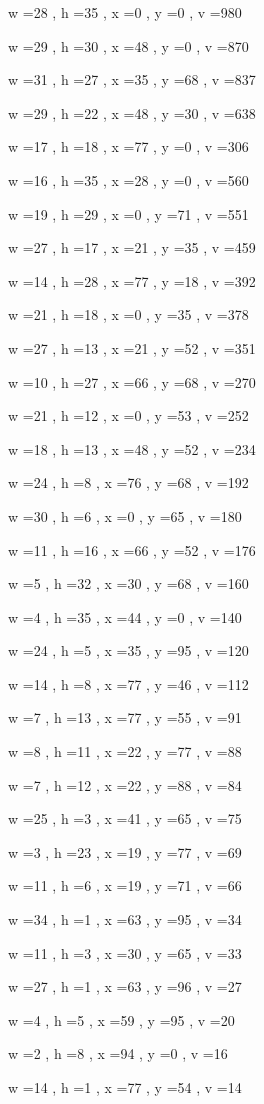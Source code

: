 \documentclass[11pt]{article}
\begin{document}
w =28 , h =35 , x =0 , y =0 , v =980
\par
w =29 , h =30 , x =48 , y =0 , v =870
\par
w =31 , h =27 , x =35 , y =68 , v =837
\par
w =29 , h =22 , x =48 , y =30 , v =638
\par
w =17 , h =18 , x =77 , y =0 , v =306
\par
w =16 , h =35 , x =28 , y =0 , v =560
\par
w =19 , h =29 , x =0 , y =71 , v =551
\par
w =27 , h =17 , x =21 , y =35 , v =459
\par
w =14 , h =28 , x =77 , y =18 , v =392
\par
w =21 , h =18 , x =0 , y =35 , v =378
\par
w =27 , h =13 , x =21 , y =52 , v =351
\par
w =10 , h =27 , x =66 , y =68 , v =270
\par
w =21 , h =12 , x =0 , y =53 , v =252
\par
w =18 , h =13 , x =48 , y =52 , v =234
\par
w =24 , h =8 , x =76 , y =68 , v =192
\par
w =30 , h =6 , x =0 , y =65 , v =180
\par
w =11 , h =16 , x =66 , y =52 , v =176
\par
w =5 , h =32 , x =30 , y =68 , v =160
\par
w =4 , h =35 , x =44 , y =0 , v =140
\par
w =24 , h =5 , x =35 , y =95 , v =120
\par
w =14 , h =8 , x =77 , y =46 , v =112
\par
w =7 , h =13 , x =77 , y =55 , v =91
\par
w =8 , h =11 , x =22 , y =77 , v =88
\par
w =7 , h =12 , x =22 , y =88 , v =84
\par
w =25 , h =3 , x =41 , y =65 , v =75
\par
w =3 , h =23 , x =19 , y =77 , v =69
\par
w =11 , h =6 , x =19 , y =71 , v =66
\par
w =34 , h =1 , x =63 , y =95 , v =34
\par
w =11 , h =3 , x =30 , y =65 , v =33
\par
w =27 , h =1 , x =63 , y =96 , v =27
\par
w =4 , h =5 , x =59 , y =95 , v =20
\par
w =2 , h =8 , x =94 , y =0 , v =16
\par
w =14 , h =1 , x =77 , y =54 , v =14
\par
\newpage
\end{document}
